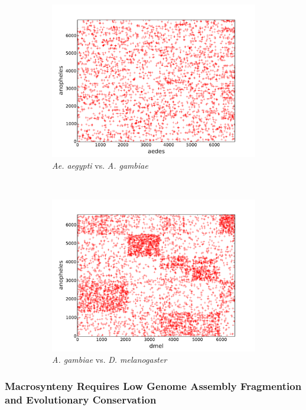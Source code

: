 \begin{figure}[H]
\begin{subfigure}[b]{0.45\textwidth}
    \includegraphics[width=\textwidth]{figures/synteny/aedes_anopheles_plot}
    \caption{\emph{Ae. aegypti} vs. \emph{A. gambiae}}
  \end{subfigure}
  ~
  \begin{subfigure}[b]{0.45\textwidth}
    \includegraphics[width=\textwidth]{figures/synteny/dmel_anopheles_plot}
    \caption{\emph{A. gambiae} vs. \emph{D. melanogaster}}
  \end{subfigure}
\label{fig:dot-plots}
\caption{}
\end{figure}

\subsubsection{Macrosynteny Requires Low Genome Assembly Fragmention and Evolutionary Conservation}

